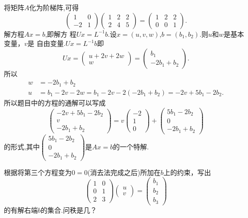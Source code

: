 ﻿\documentclass{book} \usepackage{exsheets} \usepackage{xeCJK}
\begin{document}
\begin{solution}
  将矩阵$A$化为阶梯阵,可得
$$
\begin{pmatrix}
  1&0\\
  -2&1
\end{pmatrix}
\begin{pmatrix}
  1&2&2\\
  2&4&5
\end{pmatrix}=
\begin{pmatrix}
  1&2&2\\
  0&0&1
\end{pmatrix}.
$$
解方程$Ax=b$,即解方
程$Ux=L^{-1}b$.设$x=(u,v,w)$,$b=(b_1,b_2)$.则$u$和$w$是基本变量，$v$是
自由变量.$Ux=L^{-1}b$即
$$
Ux=
\begin{pmatrix}
  u+2v+2w\\
  w
\end{pmatrix}=
\begin{pmatrix}
  b_1\\
  -2b_1+b_2
\end{pmatrix}.
$$
所以
\begin{align*}
  w&=-2b_1+b_2\\
  u&=b_1-2v-2w=b_1-2v-2(-2b_1+b_2)=-2v+5b_1-2b_2.
\end{align*}
所以题目中的方程的通解可以写成
$$
\begin{pmatrix}
  -2v+5b_1-2b_2\\
  v\\
  -2b_1+b_2
\end{pmatrix}=v
\begin{pmatrix}
  -2\\
  1\\
  0
\end{pmatrix}+
\begin{pmatrix}
  5b_1-2b_2\\
  0\\
  -2b_1+b_2
\end{pmatrix}
$$
的形式,其中$
\begin{pmatrix}
  5b_1-2b_2\\
  0\\
  -2b_1+b_2
\end{pmatrix}
$是$Ax=b$的一个特解.
\end{solution}
\begin{question}
  根据将第三个方程变为$0=0$(消去法完成之后)所加在$b$上的约束，写出
$$
\begin{pmatrix}
  1&0\\
  0&1\\
  2&3
\end{pmatrix}
\begin{pmatrix}
  u\\
  v
\end{pmatrix}=
\begin{pmatrix}
  b_1\\
  b_2\\
  b_3
\end{pmatrix}
$$
的有解右端$b$的集合.问秩是几？
\end{question}
\end{document}
